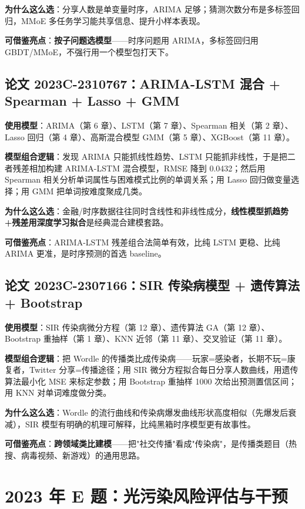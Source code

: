 \textbf{为什么这么选}：分享人数是单变量时序，ARIMA 足够；猜测次数分布是多标签回归，MMoE 多任务学习能共享信息、提升小样本表现。

\textbf{可借鉴亮点}：\textbf{按子问题选模型}——时序问题用 ARIMA，多标签回归用 GBDT/MMoE，不强行用一个模型包打天下。

\subsection{论文 2023C-2310767：ARIMA-LSTM 混合 + Spearman + Lasso + GMM}
\textbf{使用模型}：ARIMA（第 6 章）、LSTM（第 7 章）、Spearman 相关（第 2 章）、Lasso 回归（第 4 章）、高斯混合模型 GMM（第 5 章）、XGBoost（第 11 章）。

\textbf{模型组合逻辑}：发现 ARIMA 只能抓线性趋势、LSTM 只能抓非线性，于是把二者残差相加构建 ARIMA-LSTM 混合模型，RMSE 降到 0.0432；然后用 Spearman 相关分析单词属性与困难模式比例的单调关系；用 Lasso 回归做变量选择；用 GMM 把单词按难度聚成几类。

\textbf{为什么这么选}：金融/时序数据往往同时含线性和非线性成分，\textbf{线性模型抓趋势+残差用深度学习拟合}是经典混合建模套路。

\textbf{可借鉴亮点}：ARIMA-LSTM 残差组合法简单有效，比纯 LSTM 更稳、比纯 ARIMA 更准，是时序预测的首选 baseline。

\subsection{论文 2023C-2307166：SIR 传染病模型 + 遗传算法 + Bootstrap}
\textbf{使用模型}：SIR 传染病微分方程（第 12 章）、遗传算法 GA（第 12 章）、Bootstrap 重抽样（第 1 章）、KNN 近邻（第 11 章）、交叉验证（第 11 章）。

\textbf{模型组合逻辑}：把 Wordle 的传播类比成传染病——玩家=感染者，长期不玩=康复者，Twitter 分享=传播途径；用 SIR 微分方程拟合每日分享人数曲线，用遗传算法最小化 MSE 来标定参数；用 Bootstrap 重抽样 1000 次给出预测置信区间；用 KNN 对单词难度做分类。

\textbf{为什么这么选}：Wordle 的流行曲线和传染病爆发曲线形状高度相似（先爆发后衰减），SIR 模型有明确的机理可解释，比纯黑箱时序模型更有故事性。

\textbf{可借鉴亮点}：\textbf{跨领域类比建模}——把"社交传播"看成"传染病"，是传播类题目（热搜、病毒视频、新游戏）的通用思路。

\section{2023 年 E 题：光污染风险评估与干预}

